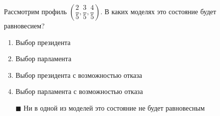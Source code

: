 \solution %

\task
Рассмотрим профиль $\left(\dfrac{2}{5}, \dfrac{3}{5}, \dfrac{4}{5}\right)$. В каких моделях это состояние будет равновесием?
\begin{enumerate}[label=$\square$]
	
	
	
	
	
	
	\item Выбор президента %
	\item Выбор парламента
	\item Выбор президента с возможностью отказа
	\item Выбор парламента с возможностью отказа
	\item[$\blacksquare$] Ни в одной из моделей это состояние не будет равновесным
\end{enumerate}

